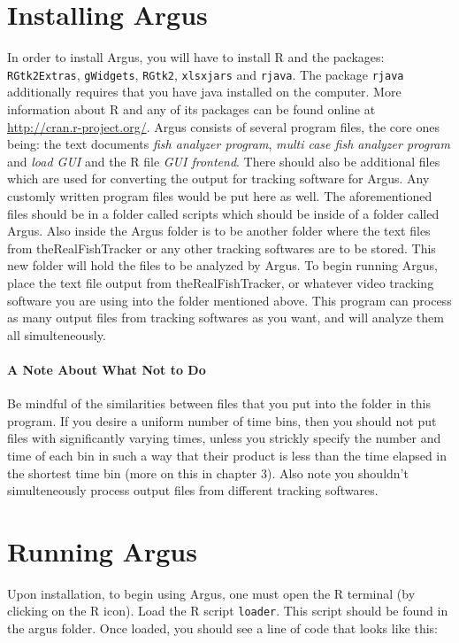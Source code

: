 \documentclass[12pt,titlepage]{report}
\begin{document}
\section{Installing Argus}
In order to install Argus, you will have to install R and the packages: \texttt{ RGtk2Extras}, \texttt{gWidgets}, \texttt{RGtk2}, \texttt{xlsxjars} and \texttt{rjava}. The package \texttt{rjava} additionally requires that you have java installed on the computer. More information about R and any of its packages can be found online at \url{http://cran.r-project.org/}.
 Argus consists of several program files, the core ones being: the text documents \emph{fish analyzer program}, \emph{multi case fish analyzer program} and \emph{load GUI} and the R file \emph{GUI frontend}. There should also be additional files which are used for converting the output for tracking software for Argus. Any customly written program files would be put here as well. The aforementioned files should be in a folder called scripts which should be inside of a folder called Argus. Also inside the Argus folder is to be another folder where the text files from theRealFishTracker or any other tracking softwares are to be stored. This new folder will hold the files to be analyzed by Argus.
To begin running Argus, place the text file output from theRealFishTracker, or whatever video tracking software you are using into the folder mentioned above. This program can process as many output files from tracking softwares as you want, and will analyze them all simulteneously. \\
\paragraph{A Note About What Not to Do}
Be mindful of the similarities between files that you put into the folder in this program. If you desire a uniform number of time bins, then you should not put files with significantly varying times, unless you strickly specify the number and time of each bin in such a way that their product is less than the time elapsed in the shortest time bin (more on this in chapter 3). Also note you shouldn't simulteneously process output files from different tracking softwares.\\

\section{Running Argus}
Upon installation, to begin using Argus, one must open the R terminal (by clicking on the R icon). Load the R script \texttt{loader}. This script should be found in the argus folder. Once loaded, you should see a line of code that looks like this:
\end{document}
